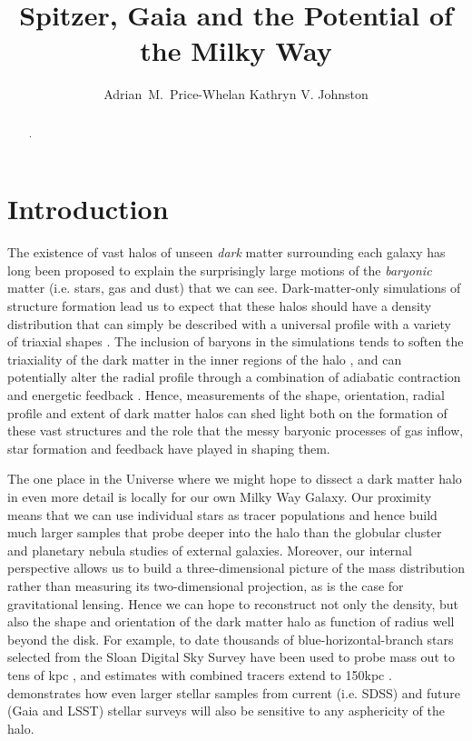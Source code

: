 \documentclass[preprint]{aastex}
\begin{document}
\title{Spitzer, Gaia and the Potential of the Milky Way}

\author{Adrian~M.~Price-Whelan Kathryn V. Johnston}


\begin{abstract}
.
\end{abstract}


\section{Introduction}
\label{intro.sec}
 The existence of vast halos of unseen {\it dark} matter surrounding each galaxy has long been proposed \citep[e.g.,][]{zwicky37,rubin70} to explain the surprisingly large
motions of the {\it baryonic} matter (i.e. stars, gas and dust) that we can see.
Dark-matter-only simulations of structure formation lead us to expect that these  halos should have a density distribution that can simply be described with a universal
profile \citep{nfw96} with a variety of triaxial shapes \citep{jing02}.
The inclusion of baryons in the simulations tends to soften the triaxiality of the dark matter in the inner regions of the halo \citep[as the disk forms, see e.g.,][]{bailin05}, and
can potentially alter the radial profile through a combination of adiabatic contraction and energetic feedback \citep[see recent discussion by][]{pontzen12}.
Hence, measurements of the shape, orientation, radial profile and extent of dark matter halos can shed light both on the formation of these vast structures and the role that
the messy baryonic processes of gas inflow, star formation and feedback  have played in shaping them.

The one place in the Universe where we might hope to dissect a dark matter halo in even more detail is locally for our own Milky Way Galaxy.
Our proximity means that we can use individual stars as tracer populations and hence build much larger samples that probe deeper into the halo than the globular cluster
and planetary nebula studies of external galaxies.
Moreover, our internal perspective allows us to build a three-dimensional picture of the mass distribution rather than measuring its two-dimensional projection, as is the
case for gravitational lensing.
Hence we can hope to reconstruct not only the density, but also the shape and orientation of the dark matter halo as function of radius well beyond the disk.
For example, to date thousands of blue-horizontal-branch stars selected from the Sloan Digital Sky Survey \citep[SDSS][]{} have been used to probe mass out to tens of
kpc \citep{deason12,kafle12}, and estimates with combined tracers extend to 150kpc \citep{deason12b}.
\citet{loebman12} demonstrates how even larger stellar samples from current (i.e. SDSS) and future  (Gaia and LSST) stellar surveys will also be sensitive to any
asphericity of the halo.
\end{document}
